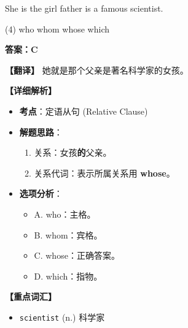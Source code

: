 \documentclass[11pt, a4paper]{article}
\newcommand{\analysis}[4]{
    \begin{solutionbox}
        \textbf{答案：#1}
        
        \textbf{【翻译】} #2
        
        \textbf{【详细解析】}
        #3
        
        \textbf{【重点词汇】}
        #4
    \end{solutionbox}
}
\newcommand{\blank}{\underline{\hspace{1.5cm}}}
\begin{document}
\begin{questions}
    \item She is the girl \blank father is a famous scientist.
    \begin{tasks}(4)
        \task who \task whom \task whose \task which
    \end{tasks}
    \analysis{C}{她就是那个父亲是著名科学家的女孩。}{
        \begin{itemize}
            \item \textbf{考点}：定语从句 (Relative Clause)
            \item \textbf{解题思路}：
                \begin{enumerate}
                    \item 关系：女孩\textbf{的}父亲。
                    \item 关系代词：表示所属关系用 \textbf{whose}。
                \end{enumerate}
            \item \textbf{选项分析}：
                \begin{itemize}
                    \item A. who：主格。
                    \item B. whom：宾格。
                    \item C. whose：正确答案。
                    \item D. which：指物。
                \end{itemize}
        \end{itemize}
    }{
        \begin{itemize}
            \item \texttt{scientist} (n.) 科学家
        \end{itemize}
    }


\end{questions}
\end{document}

